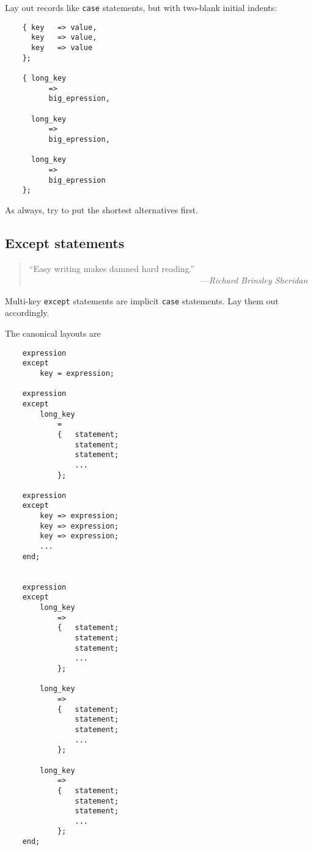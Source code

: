 Lay out records like {\tt case} statements, 
but with two-blank initial indents:


\begin{verbatim}
    { key   => value,
      key   => value,
      key   => value
    };

    { long_key
          =>
          big_epression,

      long_key
          =>
          big_epression,

      long_key
          =>
          big_epression
    };
\end{verbatim}


As always, try to put the shortest alternatives first.


\subsection{Except statements}

\begin{quote}\begin{tiny}
               ``Easy writing makes damned hard reading.''\newline
               ~~~~~~~~~~~~~~~~~~~~~~~~~~~~~~~~~~~~~~~~---{\em Richard Brinsley Sheridan }
\end{tiny}\end{quote}



Multi-key {\tt except} statements are implicit {\tt case} statements.
Lay them out accordingly.

The canonical layouts are

\begin{verbatim}
    expression
    except
        key = expression;

    expression
    except
        long_key
            =
            {   statement;
                statement;
                statement;
                ...
            };

    expression
    except
        key => expression;
        key => expression;
        key => expression;
        ...
    end;


    expression
    except
        long_key
            =>
            {   statement;
                statement;
                statement;
                ...
            };

        long_key
            =>
            {   statement;
                statement;
                statement;
                ...
            };

        long_key
            =>
            {   statement;
                statement;
                statement;
                ...
            };
    end;

\end{verbatim}


